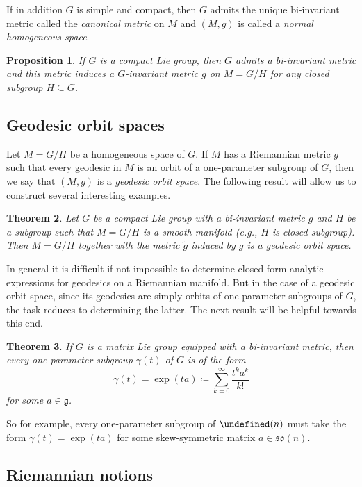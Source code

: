\documentclass[11pt,reqno]{amsart}%
\newtheorem{theorem}{Theorem}[section]
\newtheorem{proposition}[theorem]{Proposition}
\theoremstyle{definition}
\theoremstyle{remark}
\let\SO\undefined
\DeclareMathOperator{\SO}{SO}
\begin{document}
If in addition $G$ is simple and compact, then $G$ admits the unique bi-invariant metric  called the \emph{canonical metric} on $M$ and $(M,g)$ is called a \emph{normal homogeneous space}.
\begin{proposition}\label{prop:nhs}
If $G$ is a compact Lie group, then $G$ admits a bi-invariant metric and this metric induces a $G$-invariant metric $g$ on $M = G/H$ for any closed subgroup $H\subseteq G$.
\end{proposition}

\subsection{Geodesic orbit spaces}
Let $M = G/H$ be a homogeneous space of $G$. If $M$ has a Riemannian metric $g$ such that every geodesic in $M$ is an orbit of a one-parameter subgroup of $G$, then we say that $(M,g)$ is a \emph{geodesic orbit space}. The following result \cite{KS2000} will allow us to construct several interesting examples.
\begin{theorem}\label{thm:GO}
Let $G$ be a compact Lie group with a bi-invariant metric $g$ and  $H$ be a subgroup such that $M = G/H$ is a smooth manifold (e.g., $H$ is closed subgroup). Then $M = G/H$ together with the metric $\widetilde{g}$ induced by $g$ is a geodesic orbit space.
\end{theorem}

In general it is difficult if not impossible to determine closed form analytic expressions for geodesics on a Riemannian manifold. But in the case of a geodesic orbit space, since its geodesics are simply orbits of one-parameter subgroups of $G$, the task reduces to determining the latter. The next result \cite[Theorem~1.3.5]{GW2009} will be helpful towards this end.
\begin{theorem}\label{thm:1-parameter subgp}
If $G$ is a matrix Lie group equipped with a bi-invariant metric, then every one-parameter subgroup $\gamma(t)$ of $G$ is of the form 
\[
\gamma(t) = \exp (ta) \coloneqq \sum_{k=0}^\infty \frac{t^ka^k}{k!}
\]
for some $a \in \mathfrak{g}$.
\end{theorem}
So for example, every one-parameter subgroup of $\SO(n)$ must take the form $\gamma(t)  =\exp (ta)$ for some skew-symmetric matrix $a\in \mathfrak{so}(n)$.

\subsection{Riemannian notions}\label{sec:Riem}
\end{document}

